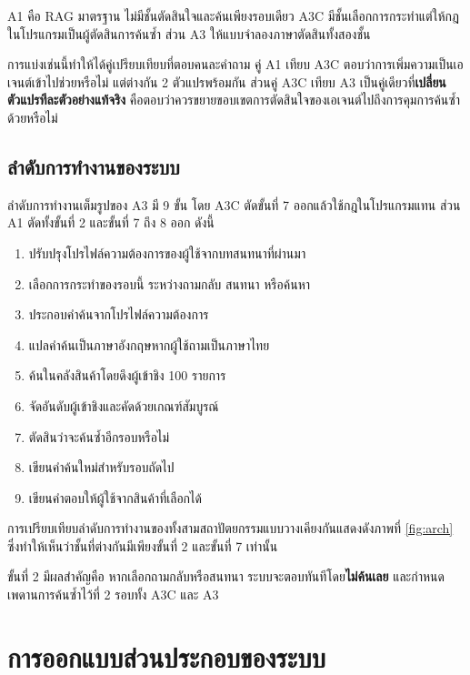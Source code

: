 A1 คือ RAG มาตรฐาน ไม่มีชั้นตัดสินใจและค้นเพียงรอบเดียว A3C มีชั้นเลือกการกระทำแต่ให้กฎในโปรแกรมเป็นผู้ตัดสินการค้นซ้ำ ส่วน A3 ให้แบบจำลองภาษาตัดสินทั้งสองชั้น

การแบ่งเช่นนี้ทำให้ได้คู่เปรียบเทียบที่ตอบคนละคำถาม คู่ A1 เทียบ A3C ตอบว่าการเพิ่มความเป็นเอเจนต์เข้าไปช่วยหรือไม่ แต่ต่างกัน 2 ตัวแปรพร้อมกัน ส่วนคู่ A3C เทียบ A3 เป็นคู่เดียวที่\textbf{เปลี่ยนตัวแปรทีละตัวอย่างแท้จริง} คือตอบว่าควรขยายขอบเขตการตัดสินใจของเอเจนต์ไปถึงการคุมการค้นซ้ำด้วยหรือไม่

\subsection{ลำดับการทำงานของระบบ}

ลำดับการทำงานเต็มรูปของ A3 มี 9 ขั้น โดย A3C ตัดขั้นที่ 7 ออกแล้วใช้กฎในโปรแกรมแทน ส่วน A1 ตัดทั้งขั้นที่ 2 และขั้นที่ 7 ถึง 8 ออก ดังนี้

\begin{enumerate}[label=\arabic*)]
    \item ปรับปรุงโปรไฟล์ความต้องการของผู้ใช้จากบทสนทนาที่ผ่านมา
    \item เลือกการกระทำของรอบนี้ ระหว่างถามกลับ สนทนา หรือค้นหา
    \item ประกอบคำค้นจากโปรไฟล์ความต้องการ
    \item แปลคำค้นเป็นภาษาอังกฤษหากผู้ใช้ถามเป็นภาษาไทย
    \item ค้นในคลังสินค้าโดยดึงผู้เข้าชิง 100 รายการ
    \item จัดอันดับผู้เข้าชิงและคัดด้วยเกณฑ์สัมบูรณ์
    \item ตัดสินว่าจะค้นซ้ำอีกรอบหรือไม่
    \item เขียนคำค้นใหม่สำหรับรอบถัดไป
    \item เขียนคำตอบให้ผู้ใช้จากสินค้าที่เลือกได้
\end{enumerate}

การเปรียบเทียบลำดับการทำงานของทั้งสามสถาปัตยกรรมแบบวางเคียงกันแสดงดังภาพที่ \ref{fig:arch} ซึ่งทำให้เห็นว่าชั้นที่ต่างกันมีเพียงขั้นที่ 2 และขั้นที่ 7 เท่านั้น



ขั้นที่ 2 มีผลสำคัญคือ หากเลือกถามกลับหรือสนทนา ระบบจะตอบทันทีโดย\textbf{ไม่ค้นเลย} และกำหนดเพดานการค้นซ้ำไว้ที่ 2 รอบทั้ง A3C และ A3

\section{การออกแบบส่วนประกอบของระบบ}

